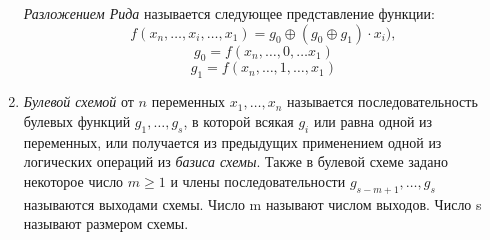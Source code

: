 \documentclass[a4paper,12pt]{article}
\begin{document}
\begin{enumerate}
    \textit{Разложением Рида} называется следующее представление функции:
    \[
    f(x_n, \ldots, x_i, \ldots, x_1) = g_0 \oplus (g_0 \oplus g_1) \cdot x_i),
    \]
    \[
    g_0 = f(x_n, \ldots, 0, \ldots x_1)
    \]
    \[
    g_1 = f(x_n, \ldots, 1, \ldots, x_1)
    \]
    \setcounter{enumi}{15}
    \item 
    \textit{Булевой схемой} от $n$ переменных $x_1, \ldots, x_n$ называется последовательность булевых функций $g_1, \ldots, g_s$, в которой всякая $g_i$ или равна одной из переменных,
    или получается из предыдущих применением одной из логических операций из \textit{базиса схемы}. Также в булевой схеме задано некоторое число $m \geq 1$
    и члены последовательности $g_{s-m+1}, \ldots, g_s$ называются выходами схемы.
    Число m называют числом выходов. Число s называют размером схемы.
    

\end{enumerate}
\end{document}
